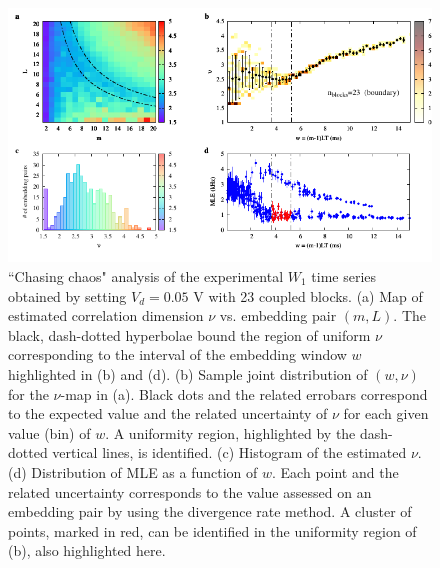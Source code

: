\begin{figure}[H]
    \centering
    \includegraphics[width=\linewidth]{../blocks/23_blocks/edge/2e5_points/plots/chaos_low.pdf}
    \caption{``Chasing chaos" analysis of the experimental $W_1$ time series obtained by setting $V_d=0.05$ V with 23 coupled blocks.
    (a) Map of estimated correlation dimension $\nu$ vs. embedding pair $(m, L)$.
    The black, dash-dotted hyperbolae bound the region of uniform $\nu$ corresponding to the interval of the
    embedding window $w$ highlighted in (b) and (d).
    (b) Sample joint distribution of $(w,\nu)$ for the $\nu$-map in (a).
    Black dots and the related errobars correspond to the expected value and the related uncertainty of $\nu$
    for each given value (bin) of $w$. A uniformity region, highlighted by the dash-dotted vertical lines,
    is identified. (c) Histogram of the estimated $\nu$. (d) Distribution of MLE as a function of $w$. Each point and the related
    uncertainty corresponds to the value assessed on an embedding pair by using the divergence rate method.
    A cluster of points, marked in red, can be identified in the uniformity region of (b), also highlighted here.}
    \label{fig:23 blocks chaos}
\end{figure}

